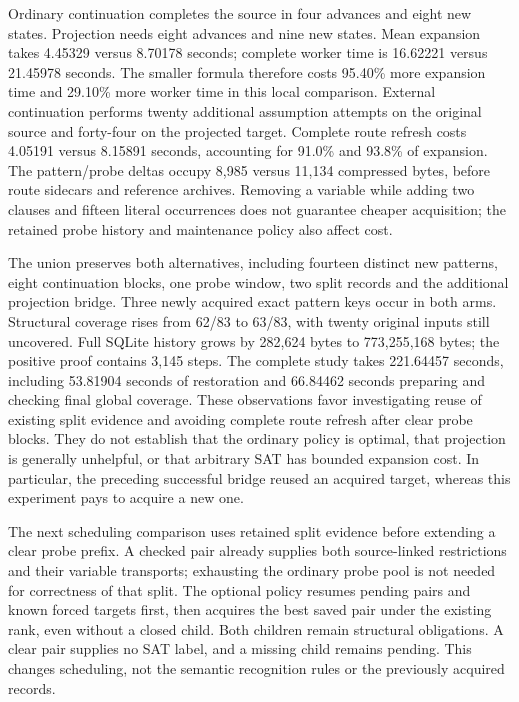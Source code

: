 \documentclass[11pt,a4paper]{article}
\numberwithin{equation}{section}
\theoremstyle{plain}
\theoremstyle{definition}
\theoremstyle{remark}
\begin{document}
Ordinary continuation completes the source in four advances and eight new states. Projection needs eight advances and nine new states. Mean expansion takes 4.45329 versus 8.70178 seconds; complete worker time is 16.62221 versus 21.45978 seconds. The smaller formula therefore costs 95.40\% more expansion time and 29.10\% more worker time in this local comparison. External continuation performs twenty additional assumption attempts on the original source and forty-four on the projected target. Complete route refresh costs 4.05191 versus 8.15891 seconds, accounting for 91.0\% and 93.8\% of expansion. The pattern/probe deltas occupy 8,985 versus 11,134 compressed bytes, before route sidecars and reference archives. Removing a variable while adding two clauses and fifteen literal occurrences does not guarantee cheaper acquisition; the retained probe history and maintenance policy also affect cost.

The union preserves both alternatives, including fourteen distinct new patterns, eight continuation blocks, one probe window, two split records and the additional projection bridge. Three newly acquired exact pattern keys occur in both arms. Structural coverage rises from 62/83 to 63/83, with twenty original inputs still uncovered. Full SQLite history grows by 282,624 bytes to 773,255,168 bytes; the positive proof contains 3,145 steps. The complete study takes 221.64457 seconds, including 53.81904 seconds of restoration and 66.84462 seconds preparing and checking final global coverage. These observations favor investigating reuse of existing split evidence and avoiding complete route refresh after clear probe blocks. They do not establish that the ordinary policy is optimal, that projection is generally unhelpful, or that arbitrary SAT has bounded expansion cost. In particular, the preceding successful bridge reused an acquired target, whereas this experiment pays to acquire a new one.

The next scheduling comparison uses retained split evidence before extending a clear probe prefix. A checked pair already supplies both source-linked restrictions and their variable transports; exhausting the ordinary probe pool is not needed for correctness of that split. The optional policy resumes pending pairs and known forced targets first, then acquires the best saved pair under the existing rank, even without a closed child. Both children remain structural obligations. A clear pair supplies no SAT label, and a missing child remains pending. This changes scheduling, not the semantic recognition rules or the previously acquired records.
\end{document}
